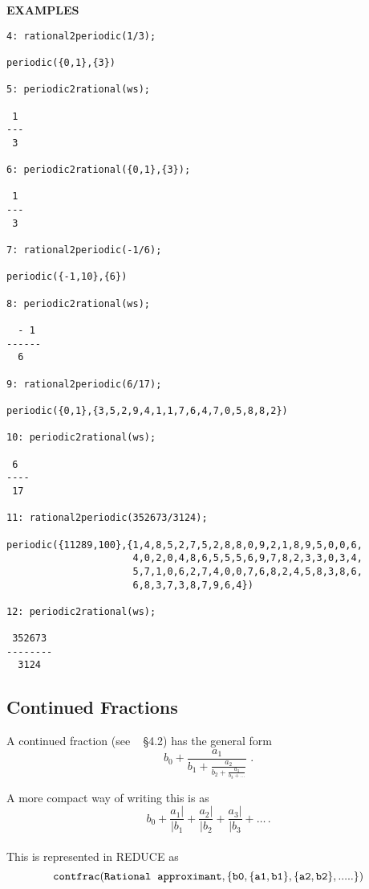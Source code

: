 {\large\bf EXAMPLES}\\
\begin{verbatim}
4: rational2periodic(1/3);

periodic({0,1},{3})

5: periodic2rational(ws);

 1
---
 3

6: periodic2rational({0,1},{3});

 1
---
 3

7: rational2periodic(-1/6);

periodic({-1,10},{6})

8: periodic2rational(ws);

  - 1
------
  6

9: rational2periodic(6/17);

periodic({0,1},{3,5,2,9,4,1,1,7,6,4,7,0,5,8,8,2})

10: periodic2rational(ws);

 6
----
 17

11: rational2periodic(352673/3124);

periodic({11289,100},{1,4,8,5,2,7,5,2,8,8,0,9,2,1,8,9,5,0,0,6,
                      4,0,2,0,4,8,6,5,5,5,6,9,7,8,2,3,3,0,3,4,
                      5,7,1,0,6,2,7,4,0,0,7,6,8,2,4,5,8,3,8,6,
                      6,8,3,7,3,8,7,9,6,4})

12: periodic2rational(ws);

 352673
--------
  3124

\end{verbatim}
\subsection{Continued Fractions}

A continued fraction (see ~\cite{PA} \S 4.2) has the general form
{\Large
\[b_0 + \frac{a_1}{b_1 +
         \frac{a_2}{b_2+
          \frac{a_3}{b_3 + \ldots
        }}}
\;.\]
}

A more compact way of writing this is as
\[b_0 + \frac{a_1|}{|b_1} + \frac{a_2|}{|b_2} + \frac{a_3|}{|b_3} + \ldots\,.\]
\\

This is represented in {\small REDUCE} as
\[{\tt
   contfrac({\sl Rational\hspace{2mm} approximant},
                \{b0, \{a1,b1\}, \{a2,b2\},.....\})
}\]

